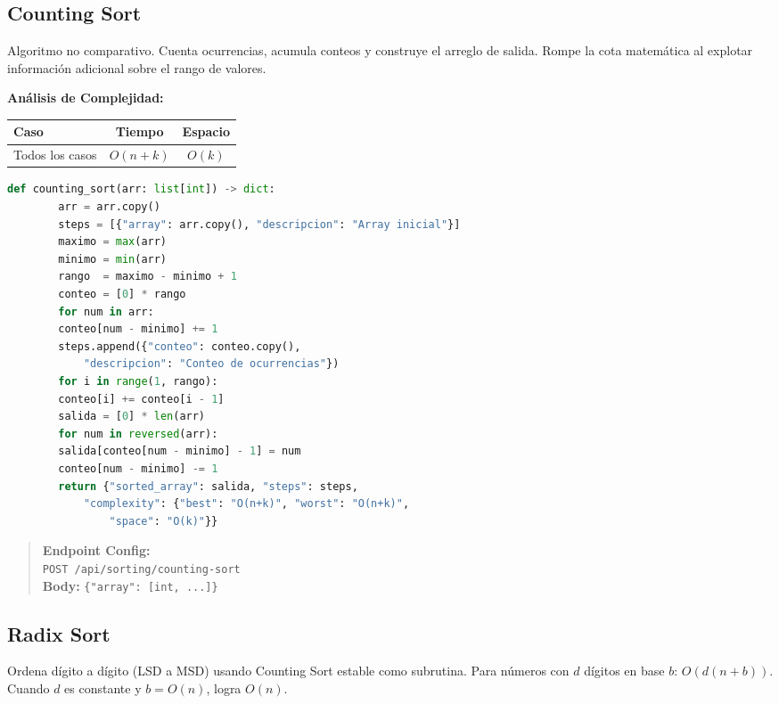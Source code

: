 \documentclass[12pt, letterpaper]{article}
\begin{document}
	\subsection{Counting Sort}
	Algoritmo no comparativo. Cuenta ocurrencias, acumula conteos y construye el arreglo de salida. Rompe la cota matemática al explotar información adicional sobre el rango de valores.
	
	\textbf{Análisis de Complejidad:}
	\begin{table}[h]
		\centering
		\begin{tabular}{@{}lcc@{}}
			\toprule
			\textbf{Caso} & \textbf{Tiempo} & \textbf{Espacio} \\ \midrule
			Todos los casos & $O(n + k)$ & $O(k)$ \\ \bottomrule
		\end{tabular}
	\end{table}
	
	\begin{lstlisting}[language=Python, caption={Implementacion de Counting Sort}]
		def counting_sort(arr: list[int]) -> dict:
		arr = arr.copy()
		steps = [{"array": arr.copy(), "descripcion": "Array inicial"}]
		maximo = max(arr)
		minimo = min(arr)
		rango  = maximo - minimo + 1
		conteo = [0] * rango
		for num in arr:
		conteo[num - minimo] += 1
		steps.append({"conteo": conteo.copy(),
			"descripcion": "Conteo de ocurrencias"})
		for i in range(1, rango):
		conteo[i] += conteo[i - 1]
		salida = [0] * len(arr)
		for num in reversed(arr):
		salida[conteo[num - minimo] - 1] = num
		conteo[num - minimo] -= 1
		return {"sorted_array": salida, "steps": steps,
			"complexity": {"best": "O(n+k)", "worst": "O(n+k)",
				"space": "O(k)"}}
	\end{lstlisting}
	
	\begin{quote}
		\textbf{Endpoint Config:} \\
		\texttt{POST /api/sorting/counting-sort} \\
		\textbf{Body:} \texttt{\{"array": [int, ...]\}}
	\end{quote}
	
	\subsection{Radix Sort}
	Ordena dígito a dígito (LSD a MSD) usando Counting Sort estable como subrutina. Para números con $d$ dígitos en base $b$: $O(d(n+b))$. Cuando $d$ es constante y $b = O(n)$, logra $O(n)$.
	
\end{document}
